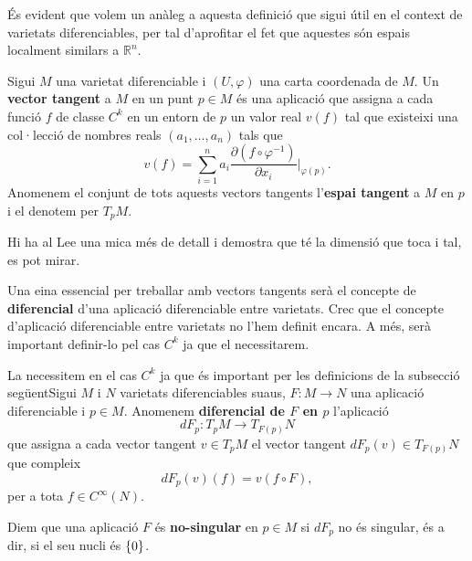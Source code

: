 És evident que volem un anàleg a aquesta definició que sigui útil en el context de varietats diferenciables, per tal d'aprofitar el fet que aquestes són espais localment similars a $\mathbb R^n$. 
\begin{defi}
    Sigui $M$ una varietat diferenciable i $(U,\varphi)$ una carta coordenada de $M$. Un \textbf{vector tangent} a $M$ en un punt $p\in M$ és una aplicació que assigna a cada funció $f$ de classe $C^k$ en un entorn de $p$ un valor real $v(f)$ tal que existeixi una col·lecció de nombres reals $(a_1,\dots,a_n)$ tals que
    \begin{equation*}
        v(f) = \sum_{i=1}^n a_i\frac{\partial (f\circ\varphi^{-1})}{\partial x_i}\Big|_{\varphi(p)}.
    \end{equation*}
    Anomenem el conjunt de tots aquests vectors tangents l'\textbf{espai tangent} a $M$ en $p$ i el denotem per $T_pM$.
\end{defi}
{\color{blue} Hi ha al Lee una mica més de detall i demostra que té la dimensió que toca i tal, es pot mirar.}

Una eina essencial per treballar amb vectors tangents serà el concepte de \textbf{diferencial} d'una aplicació diferenciable entre varietats.
{\color{blue} Crec que el concepte d'aplicació diferenciable entre varietats no l'hem definit encara. A més, serà important definir-lo pel cas $C^k$ ja que el necessitarem.}
\begin{defi}
    {\color{blue} La necessitem en el cas $C^k$ ja que és important per les definicions de la subsecció següent}Sigui $M$ i $N$ varietats diferenciables suaus, $F:M\to N$ una aplicació diferenciable i $p\in M$. Anomenem \textbf{diferencial de $F$ en $p$} l'aplicació
    \begin{equation*}
        dF_p:T_pM\to T_{F(p)}N
    \end{equation*}
    que assigna a cada vector tangent $v\in T_pM$ el vector tangent $dF_p(v)\in T_{F(p)}N$ que compleix
    \begin{equation*}
        dF_p(v)(f) = v(f\circ F),
    \end{equation*}
    per a tota $f\in C^\infty(N)$.
\end{defi}
\begin{defi}
    Diem que una aplicació $F$ és \textbf{no-singular} en $p\in M$ si $dF_p$ no és singular, és a dir, si el seu nucli és $\{0\}$.
\end{defi}
